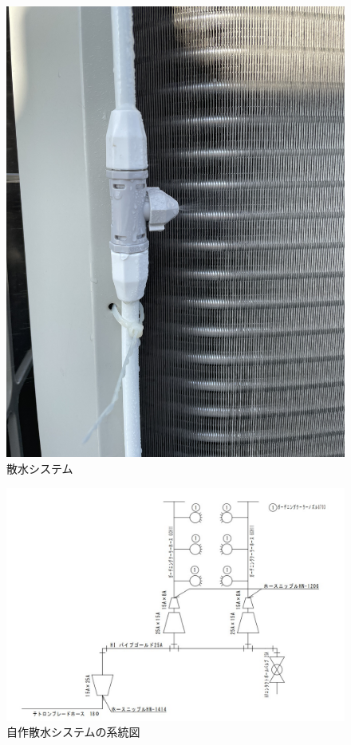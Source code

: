 \documentclass[a4j,fleqn,dvipdfmx,uplatex]{jsarticle}
\begin{document}
\begin{figure}[htb]
\begin{minipage}[b]{0.45\linewidth}
      \centering
      \includegraphics[width=\linewidth]{img/IMG_0142.jpg}
    \end{minipage}
  \caption{散水システム}
  \label{fig2:watering_sys}
\end{figure}

\begin{figure}[htb]
  \centering
  \includegraphics[width=\linewidth]{img/flow.jpg}
  \caption{自作散水システムの系統図}
  \label{fig:w_s_flow}
\end{figure}
\end{document}

